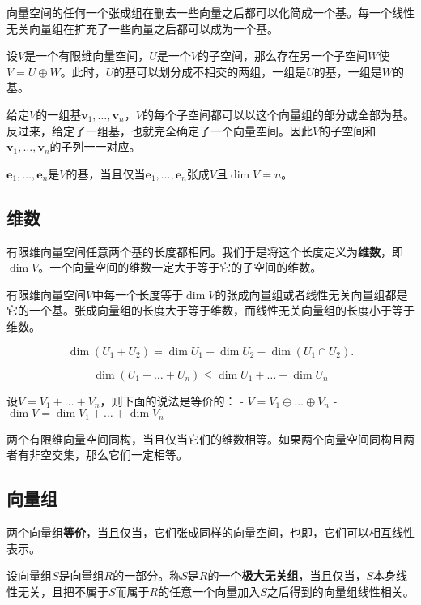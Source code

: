 \documentclass[UTF8]{ctexart}
\theoremstyle{definition}
\begin{document}
向量空间的任何一个张成组在删去一些向量之后都可以化简成一个基。每一个线性无关向量组在扩充了一些向量之后都可以成为一个基。

设$V$是一个有限维向量空间，$U$是一个$V$的子空间，那么存在另一个子空间$W$使$V=U \oplus W$。此时，$U$的基可以划分成不相交的两组，一组是$U$的基，一组是$W$的基。

给定$V$的一组基$\boldsymbol{v}_1, \ldots, \boldsymbol{v}_n$，$V$的每个子空间都可以以这个向量组的部分或全部为基。反过来，给定了一组基，也就完全确定了一个向量空间。因此$V$的子空间和$\boldsymbol{v}_1, \ldots, \boldsymbol{v}_n$的子列一一对应。

$\boldsymbol{e}_1, \ldots, \boldsymbol{e}_n$是$V$的基，当且仅当$\boldsymbol{e}_1, \ldots, \boldsymbol{e}_n$张成$V$且$\dim V = n$。

\hypertarget{ux7ef4ux6570}{%
\subsection{维数}\label{ux7ef4ux6570}}

有限维向量空间任意两个基的长度都相同。我们于是将这个长度定义为\textbf{维数}，即$\dim V$。一个向量空间的维数一定大于等于它的子空间的维数。

有限维向量空间$V$中每一个长度等于$\dim V$的张成向量组或者线性无关向量组都是它的一个基。张成向量组的长度大于等于维数，而线性无关向量组的长度小于等于维数。

\[
\dim (U_1 + U_2) = \dim U_1 + \dim U_2 - \dim (U_1 \cap U_2).
\]

\[
\dim (U_1 + \ldots + U_n) \leq \dim U_1 + \ldots + \dim U_n
\]

设$V=V_1 + \ldots + V_n$，则下面的说法是等价的： -
$V = V_1 \oplus \ldots \oplus V_n$ -
$\dim V = \dim V_1 + \ldots + \dim V_n$

两个有限维向量空间同构，当且仅当它们的维数相等。如果两个向量空间同构且两者有非空交集，那么它们一定相等。

\hypertarget{ux5411ux91cfux7ec4}{%
\subsection{向量组}\label{ux5411ux91cfux7ec4}}

两个向量组\textbf{等价}，当且仅当，它们张成同样的向量空间，也即，它们可以相互线性表示。

设向量组$S$是向量组$R$的一部分。称$S$是$R$的一个\textbf{极大无关组}，当且仅当，$S$本身线性无关，且把不属于$S$而属于$R$的任意一个向量加入$S$之后得到的向量组线性相关。
\end{document}
